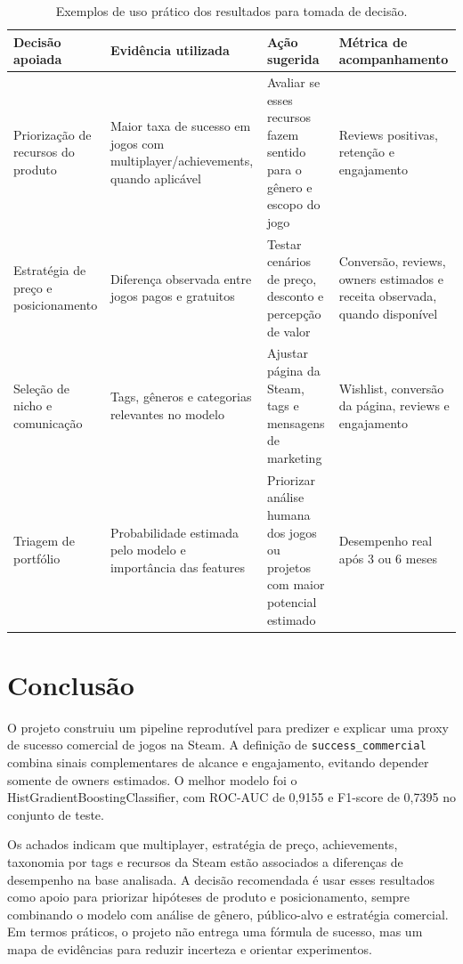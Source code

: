 \documentclass[12pt]{article}
\begin{document}
\begin{table}[ht]
\centering
\caption{Exemplos de uso prático dos resultados para tomada de decisão.}
\label{tab:uso-pratico}
\scriptsize
\begin{tabular}{p{}p{}p{}p{}}
\toprule
Decisão apoiada & Evidência utilizada & Ação sugerida & Métrica de acompanhamento \\
\midrule
Priorização de recursos do produto & Maior taxa de sucesso em jogos com multiplayer/achievements, quando aplicável & Avaliar se esses recursos fazem sentido para o gênero e escopo do jogo & Reviews positivas, retenção e engajamento \\
Estratégia de preço e posicionamento & Diferença observada entre jogos pagos e gratuitos & Testar cenários de preço, desconto e percepção de valor & Conversão, reviews, owners estimados e receita observada, quando disponível \\
Seleção de nicho e comunicação & Tags, gêneros e categorias relevantes no modelo & Ajustar página da Steam, tags e mensagens de marketing & Wishlist, conversão da página, reviews e engajamento \\
Triagem de portfólio & Probabilidade estimada pelo modelo e importância das features & Priorizar análise humana dos jogos ou projetos com maior potencial estimado & Desempenho real após 3 ou 6 meses \\
\bottomrule
\end{tabular}
\end{table}

\section{Conclusão}

O projeto construiu um pipeline reprodutível para predizer e explicar uma proxy de sucesso comercial de jogos na Steam. A definição de \texttt{success\_commercial} combina sinais complementares de alcance e engajamento, evitando depender somente de owners estimados. O melhor modelo foi o HistGradientBoostingClassifier, com ROC-AUC de 0,9155 e F1-score de 0,7395 no conjunto de teste.

Os achados indicam que multiplayer, estratégia de preço, achievements, taxonomia por tags e recursos da Steam estão associados a diferenças de desempenho na base analisada. A decisão recomendada é usar esses resultados como apoio para priorizar hipóteses de produto e posicionamento, sempre combinando o modelo com análise de gênero, público-alvo e estratégia comercial. Em termos práticos, o projeto não entrega uma fórmula de sucesso, mas um mapa de evidências para reduzir incerteza e orientar experimentos.
\end{document}
